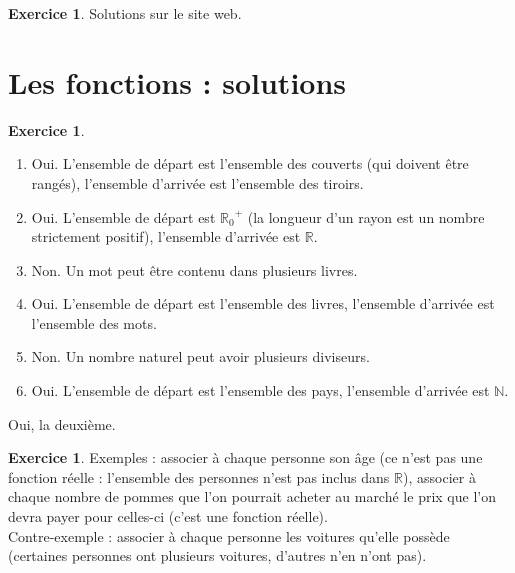 \documentclass[a4paper,13pt]{scrreprt}
\theoremstyle{plain}
\theoremstyle{definition}
\newtheorem{exo}[subsection]{Exercice}
\newcommand{\nn}{\mathbb{N}}
\newcommand{\rr}{\mathbb{R}}
\begin{document}
\begin{exo}
	Solutions sur le site web.
\end{exo}


\section{Les fonctions : solutions}

\begin{exo} ~~\\
	\begin{enumerate}
		\item Oui. L'ensemble de départ est l'ensemble des couverts (qui doivent être rangés), l'ensemble d'arrivée est l'ensemble des tiroirs.
		\item Oui. L'ensemble de départ est ${{\rr}_{0}}^{+}$ (la longueur d'un rayon est un nombre strictement positif), l'ensemble d'arrivée est $\rr$.
		\item Non. Un mot peut être contenu dans plusieurs livres.
		\item Oui. L'ensemble de départ est l'ensemble des livres, l'ensemble d'arrivée est l'ensemble des mots.
		\item Non. Un nombre naturel peut avoir plusieurs diviseurs.
		\item Oui. L'ensemble de départ est l'ensemble des pays, l'ensemble d'arrivée est $\nn$.
	\end{enumerate}
	Oui, la deuxième.
\end{exo}

\begin{exo}
	Exemples : associer à chaque personne son âge (ce n'est pas une fonction réelle : l'ensemble des personnes n'est pas inclus dans $\rr$), associer à chaque nombre de pommes que l'on pourrait acheter au marché le prix que l'on devra payer pour celles-ci (c'est une fonction réelle). \\
	Contre-exemple : associer à chaque personne les voitures qu'elle possède (certaines personnes ont plusieurs voitures, d'autres n'en n'ont pas).
\end{exo}
\end{document}
